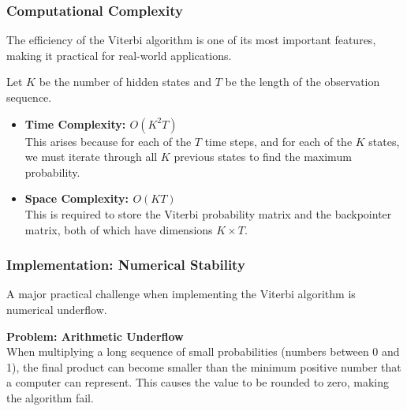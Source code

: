 \documentclass[aspectratio=43, 9pt]{beamer}
\begin{document}
\begin{frame}
    \frametitle{Computational Complexity}
    The efficiency of the Viterbi algorithm is one of its most important features, making it practical for real-world applications.
    
    \vspace{1em}
    
    \begin{NewDefinition}
        Let $K$ be the number of hidden states and $T$ be the length of the observation sequence.
        \begin{itemize}
            \item \textbf{Time Complexity: $O(K^2T)$} \\
            This arises because for each of the $T$ time steps, and for each of the $K$ states, we must iterate through all $K$ previous states to find the maximum probability.
            
            \vspace{0.5em}
            
            \item \textbf{Space Complexity: $O(KT)$} \\
            This is required to store the Viterbi probability matrix and the backpointer matrix, both of which have dimensions $K \times T$.
        \end{itemize}
    \end{NewDefinition}
\end{frame}

\begin{frame}
    \frametitle{Implementation: Numerical Stability}
    A major practical challenge when implementing the Viterbi algorithm is numerical underflow.
    
    \vspace{1em}
    
    \begin{NewDefinition}
        \textbf{Problem: Arithmetic Underflow} \\
        When multiplying a long sequence of small probabilities (numbers between 0 and 1), the final product can become smaller than the minimum positive number that a computer can represent. This causes the value to be rounded to zero, making the algorithm fail.
    \end{NewDefinition}
\end{frame}
\end{document}
